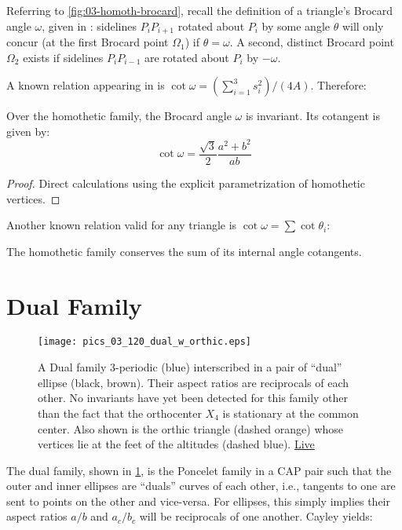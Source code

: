 Referring to \cref{fig:03-homoth-brocard}, recall the definition of a triangle's Brocard angle $\omega$, given in \cite[Brocard Angle]{mw}: sidelines $P_i P_{i+1}$ rotated about $P_i$ by some angle $\theta$ will only concur (at the first Brocard point $\Omega_1$) if $\theta=\omega$. A second, distinct Brocard point $\Omega_2$ exists if sidelines $P_i P_{i-1}$ are rotated about $P_{i}$ by $-\omega$.

A known relation appearing in \cite[Brocard Angle, Eqn. 2]{mw} is $\cot\omega=(\sum_{i=1}^3 s_i^2)/(4 A)$. Therefore:

\begin{corollary}
Over the homothetic family, the Brocard angle $\omega$ is invariant. Its cotangent is given by:
\[ \cot\omega=\frac{\sqrt{3}}{2} \frac{{a}^{2}+{b}^{2}}{a b} \]	
\end{corollary}

\begin{proof}
Direct calculations using the explicit parametrization of homothetic vertices.
\end{proof}

\noindent Another known relation valid for any triangle is $\cot\omega=\sum\cot\theta_i$:

\begin{corollary}
The homothetic family conserves the sum of its internal angle cotangents.
\end{corollary}

\section{Dual Family}

\begin{figure}
    \centering
    \texttt{[image: pics\_03\_120\_dual\_w\_orthic.eps]}
    \caption{A Dual family 3-periodic (blue) interscribed in a pair of ``dual'' ellipse (black, brown). Their aspect ratios are reciprocals of each other. No invariants have yet been detected for this family other than the fact that the orthocenter $X_4$ is stationary at the common center. Also shown is the orthic triangle (dashed orange) whose vertices lie at the feet of the altitudes (dashed blue). \href{https://bit.ly/337wTBS}{Live}}
    \label{fig:03-n3-dual}
\end{figure}


The dual family, shown in \cref{fig:03-n3-dual}, is the Poncelet family in a CAP pair such that the outer and inner ellipses are ``duals'' curves of each other, i.e., tangents to one are sent to points on the other and vice-versa. For ellipses, this simply implies their aspect ratios $a/b$ and $a_c/b_c$ will be reciprocals of one another. Cayley yields:

